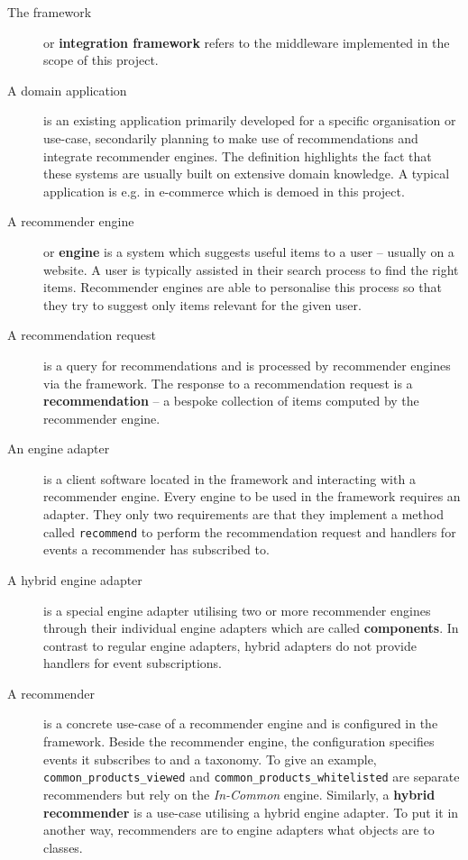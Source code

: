 \begin{description}

\item[\textnormal{The} framework] or \textbf{integration framework} refers to the middleware implemented in the scope of this project.

\item[\textnormal{A} domain application] is an existing application primarily developed for a specific organisation or use-case, secondarily planning to make use of recommendations and integrate recommender engines. The definition highlights the fact that these systems are usually built on extensive domain knowledge. A typical application is e.g. in e-commerce which is demoed in this project.

\item[\textnormal{A} recommender engine] or \textbf{engine} is a system which suggests useful items to a user -- usually on a website. A user is typically assisted in their search process to find the right items. Recommender engines are able to personalise this process so that they try to suggest only items relevant for the given user.

\item[\textnormal{A} recommendation request] is a query for recommendations and is processed by recommender engines via the framework. The response to a recommendation request is a \textbf{recommendation} -- a bespoke collection of items computed by the recommender engine.

\item[\textnormal{An} engine adapter] is a client software located in the framework and interacting with a recommender engine. Every engine to be used in the framework requires an adapter. They only two requirements are that they implement a method called \texttt{recommend} to perform the recommendation request and handlers for events a recommender has subscribed to.

\item[\textnormal{A} hybrid engine adapter] is a special engine adapter utilising two or more recommender engines through their individual engine adapters which are called \textbf{components}. In contrast to regular engine adapters, hybrid adapters do not provide handlers for event subscriptions.

\item[\textnormal{A} recommender] is a concrete use-case of a recommender engine and is configured in the framework. Beside the recommender engine, the configuration specifies events it subscribes to and a taxonomy. To give an example, \texttt{common_products_viewed} and \texttt{common_products_whitelisted} are separate recommenders but rely on the \emph{In-Common} engine. Similarly, a \textbf{hybrid recommender} is a use-case utilising a hybrid engine adapter. To put it in another way, recommenders are to engine adapters what objects are to classes.


\end{description}
